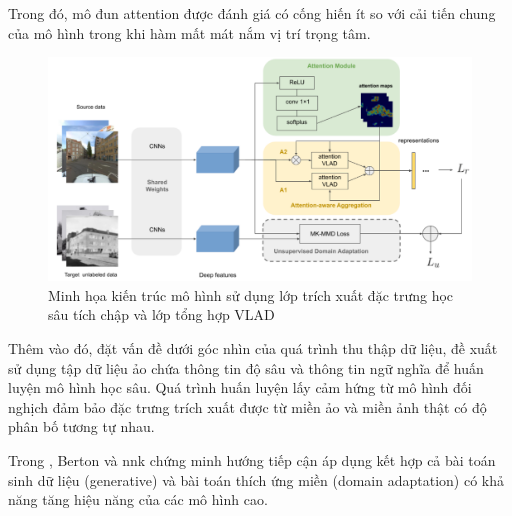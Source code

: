 Trong đó, mô đun attention được đánh giá có cống hiến ít so với cải tiến chung của mô hình trong khi hàm mất mát nắm vị trí trọng tâm.

\begin{figure}[h]
    \centering
    \includegraphics[width=\textwidth]{pics/Chapter2/cnn160.png}
    \caption{Minh họa kiến trúc mô hình sử dụng lớp trích xuất đặc trưng học sâu tích chập và lớp tổng hợp VLAD \cite{wang2019attention}}
\end{figure}

Thêm vào đó, đặt vấn đề dưới góc nhìn của quá trình thu thập dữ liệu, \cite{hu2020dasgil} đề xuất sử dụng tập dữ liệu ảo chứa thông tin độ sâu và thông tin ngữ nghĩa để huấn luyện mô hình học sâu. Quá trình huấn luyện lấy cảm hứng từ mô hình đối nghịch đảm bảo đặc trưng trích xuất được từ miền ảo và miền ảnh thật có độ phân bố tương tự nhau.

Trong \cite{PAOLICELLI-2022-FRONTIERS}, Berton và nnk chứng minh hướng tiếp cận áp dụng kết hợp cả bài toán sinh dữ liệu (generative) và bài toán thích ứng miền (domain adaptation) có khả năng tăng hiệu năng của các mô hình cao.
